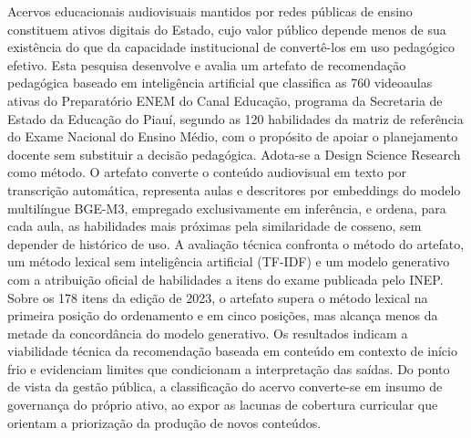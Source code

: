 
\begin{resumo}
Acervos educacionais audiovisuais mantidos por redes públicas de ensino
constituem ativos digitais do Estado, cujo valor público depende menos de sua
existência do que da capacidade institucional de convertê-los em uso pedagógico
efetivo. Esta pesquisa desenvolve e avalia um artefato de recomendação
pedagógica baseado em inteligência artificial que classifica as 760 videoaulas
ativas do Preparatório ENEM do Canal Educação, programa da Secretaria de Estado
da Educação do Piauí, segundo as 120 habilidades da matriz de referência do
Exame Nacional do Ensino Médio, com o propósito de apoiar o planejamento docente
sem substituir a decisão pedagógica. Adota-se a Design Science Research como
método. O artefato converte o conteúdo audiovisual em texto por transcrição
automática, representa aulas e descritores por embeddings do modelo multilíngue
BGE-M3, empregado exclusivamente em inferência, e ordena, para cada aula, as
habilidades mais próximas pela similaridade de cosseno, sem depender de
histórico de uso. A avaliação técnica confronta o método do artefato, um método
lexical sem inteligência artificial (TF-IDF) e um modelo generativo com a
atribuição oficial de habilidades a itens do exame publicada pelo INEP. Sobre os
178 itens da edição de 2023, o artefato supera o método lexical na primeira
posição do ordenamento e em cinco posições, mas alcança menos da metade da
concordância do modelo generativo. Os resultados indicam a viabilidade técnica
da recomendação baseada em conteúdo em contexto de início frio e evidenciam
limites que condicionam a interpretação das saídas. Do ponto de vista da gestão
pública, a classificação do acervo converte-se em insumo de governança do
próprio ativo, ao expor as lacunas de cobertura curricular que orientam a
priorização da produção de novos conteúdos.
\end{resumo}
